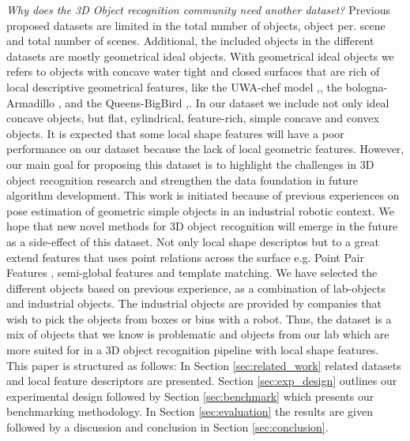 \documentclass[10pt,twocolumn,letterpaper]{article}
\begin{document}
\indent \textit{Why does the 3D Object recognition community need another dataset?} Previous proposed datasets are limited in the total number of objects, object per. scene and total number of scenes. Additional, the included objects in the different datasets are mostly geometrical ideal objects. With geometrical ideal objects we refers to objects with concave water tight and closed surfaces that are rich of local descriptive geometrical features, like the UWA-chef model \cite{Mian2006},\cite{Mian2010}, the bologna-Armadillo \cite{Salti2014},\cite{Tombari2010} and the Queens-BigBird \cite{Taati2007},\cite{Taati2007}. In our dataset we include not only ideal concave objects, but flat, cylindrical, feature-rich, simple concave and convex objects. It is expected that some local shape features will have a poor performance on our dataset because the lack of local geometric features. However, our main goal for proposing this dataset is to highlight the challenges in 3D object recognition research and strengthen the data foundation in future algorithm development. This work is initiated because of previous experiences on pose estimation of geometric simple objects in an industrial robotic context. We hope that new novel methods for 3D object recognition will emerge in the future as a side-effect of this dataset. Not only local shape descriptos but to a great extend features that uses point relations across the surface e.g. Point Pair Features \cite{BirdalIlic2015}, semi-global features and template matching.    
We have selected the different objects based on previous experience, as a combination of lab-objects and industrial objects. The industrial objects are provided by companies that wish to pick the objects from boxes or bins with a robot. Thus, the dataset is a mix of objects that we know is problematic and objects from our lab which are more suited for in a 3D object recognition pipeline with local shape features.\\
\indent This paper is structured as follows: In Section \ref{sec:related_work} related datasets and local feature descriptors are presented. Section \ref{sec:exp_design} outlines our experimental design followed by Section \ref{sec:benchmark} which presents our benchmarking methodology. In Section \ref{sec:evaluation} the results are given followed by a discussion and conclusion in Section \ref{sec:conclusion}. 
\end{document}

